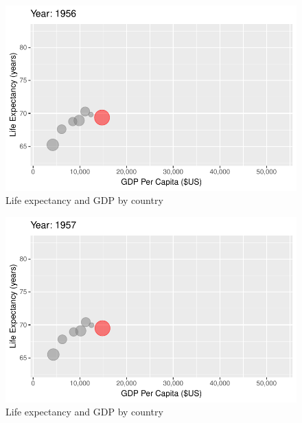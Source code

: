 \documentclass[
  letterpaper,
  DIV=11,
  numbers=noendperiod]{scrreport}
\theoremstyle{definition}
\theoremstyle{remark}
\begin{document}
\begin{figure}

{\centering \includegraphics{index_files/figure-pdf/fig-anim-country-9.pdf}

}

\caption{\label{fig-anim-country-9}Life expectancy and GDP by country}

\end{figure}

\begin{figure}

{\centering \includegraphics{index_files/figure-pdf/fig-anim-country-10.pdf}

}

\caption{\label{fig-anim-country-10}Life expectancy and GDP by country}

\end{figure}
\end{document}
